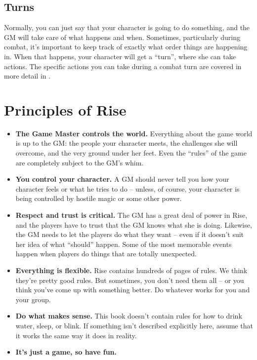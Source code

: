 \subsection{Turns}
Normally, you can just say that your character is going to do something, and the GM will take care of what happens and when.
Sometimes, particularly during combat, it's important to keep track of exactly what order things are happening in.
When that happens, your character will get a ``turn'', where she can take actions.
The specific actions you can take during a combat turn are covered in more detail in .

\section{Principles of Rise}

\begin{itemize}
    \item \textbf{The Game Master controls the world.} Everything about the game world is up to the GM: the people your character meets, the challenges she will overcome, and the very ground under her feet.
        Even the ``rules'' of the game are completely subject to the GM's whim.
    \item \textbf{You control your character.} A GM should never tell you how your character feels or what he tries to do -- unless, of course, your character is being controlled by hostile magic or some other power.
    \item \textbf{Respect and trust is critical.} The GM has a great deal of power in Rise, and the players have to trust that the GM knows what she is doing.
        Likewise, the GM needs to let the players do what they want -- even if it doesn't suit her idea of what ``should'' happen.
        Some of the most memorable events happen when players do things that are totally unexpected.
    \item \textbf{Everything is flexible.} Rise contains hundreds of pages of rules.
        We think they're pretty good rules.
        But sometimes, you don't need them all -- or you think you've come up with something better.
        Do whatever works for you and your group.
    \item \textbf{Do what makes sense.} This book doesn't contain rules for how to drink water, sleep, or blink.
        If something isn't described explicitly here, assume that it works the same way it does in reality.
    \item \textbf{It's just a game, so have fun.}
\end{itemize}


